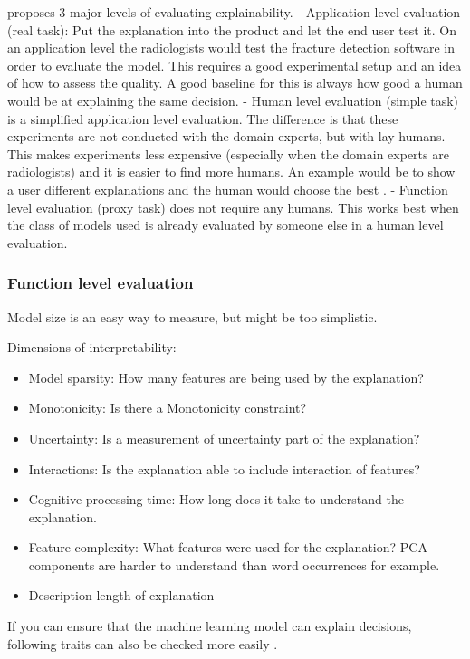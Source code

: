 \documentclass[12pt,]{krantz}
\providecommand{\tightlist}{%
  \setlength{\itemsep}{0pt}\setlength{\parskip}{0pt}}
\theoremstyle{definition}
\theoremstyle{definition}
\theoremstyle{definition}
\theoremstyle{remark}
\begin{document}
\citep{Doshi-Velez2017} proposes 3 major levels of evaluating
explainability. - Application level evaluation (real task): Put the
explanation into the product and let the end user test it. On an
application level the radiologists would test the fracture detection
software in order to evaluate the model. This requires a good
experimental setup and an idea of how to assess the quality. A good
baseline for this is always how good a human would be at explaining the
same decision. - Human level evaluation (simple task) is a simplified
application level evaluation. The difference is that these experiments
are not conducted with the domain experts, but with lay humans. This
makes experiments less expensive (especially when the domain experts are
radiologists) and it is easier to find more humans. An example would be
to show a user different explanations and the human would choose the
best . - Function level evaluation (proxy task) does not require any
humans. This works best when the class of models used is already
evaluated by someone else in a human level evaluation.

\subsubsection{Function level
evaluation}\label{function-level-evaluation}

Model size is an easy way to measure, but might be too simplistic.

Dimensions of interpretability:

\begin{itemize}
\tightlist
\item
  Model sparsity: How many features are being used by the explanation?
\item
  Monotonicity: Is there a Monotonicity constraint?
\item
  Uncertainty: Is a measurement of uncertainty part of the explanation?
\item
  Interactions: Is the explanation able to include interaction of
  features?
\item
  Cognitive processing time: How long does it take to understand the
  explanation.
\item
  Feature complexity: What features were used for the explanation? PCA
  components are harder to understand than word occurrences for example.
\item
  Description length of explanation
\end{itemize}

If you can ensure that the machine learning model can explain decisions,
following traits can also be checked more easily
\citep{Doshi-Velez2017}.
\end{document}
